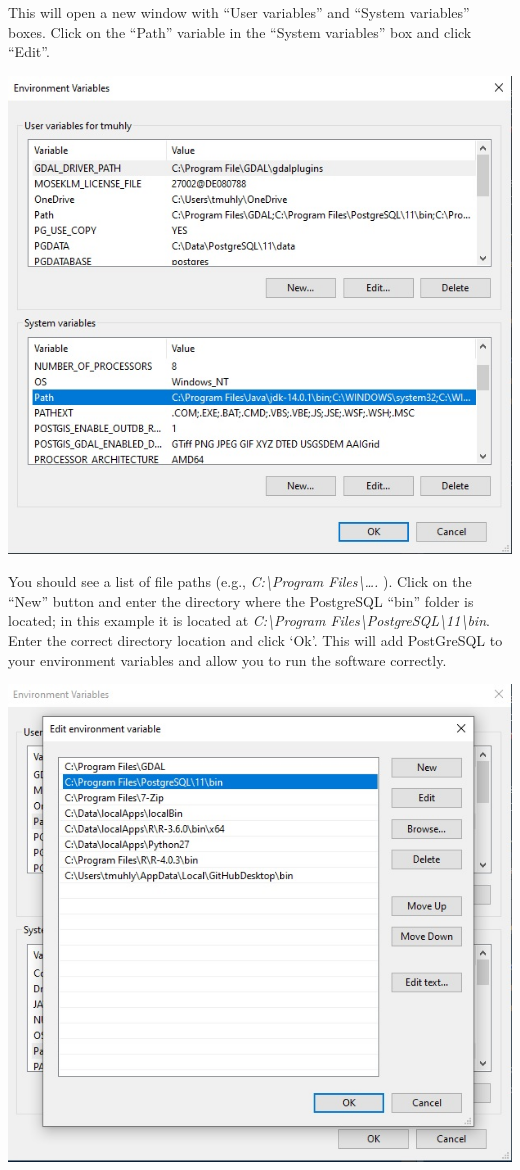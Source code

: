 \documentclass[
]{article}
\begin{document}
This will open a new window with ``User variables'' and ``System
variables'' boxes. Click on the ``Path'' variable in the ``System
variables'' box and click ``Edit''.

\includegraphics{images/system_vars.jpg}

You should see a list of file paths (e.g.,
\emph{C:\textbackslash Program Files\textbackslash\ldots.} ). Click on
the ``New'' button and enter the directory where the PostgreSQL ``bin''
folder is located; in this example it is located at
\emph{C:\textbackslash Program
Files\textbackslash PostgreSQL\textbackslash11\textbackslash bin}. Enter
the correct directory location and click `Ok'. This will add PostGreSQL
to your environment variables and allow you to run the software
correctly.

\includegraphics{images/system_edit.jpg}
\end{document}
